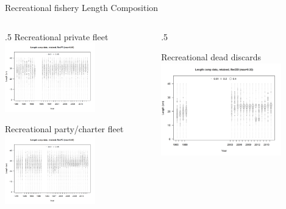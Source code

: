 \documentclass[ignorenonframetext,]{beamer}
\def\begincols{\begin{columns}}
\def\begincol{\begin{column}}
\def\endcol{\end{column}}
\def\endcols{\end{columns}}
\begin{document}
\begin{frame}{Recreational fishery Length Composition}

\begincols
 \begincol{.5\textwidth} Recreational private fleet
\includegraphics[height=3cm]{r4ss/plots_mod1/comp_lendat_bubflt4mkt2.png}

Recreational party/charter fleet
\includegraphics[height=3cm]{r4ss/plots_mod1/comp_lendat_bubflt5mkt2_page2.png}
\endcol
 \begincol{.5\textwidth} \centering

Recreational dead discards
\includegraphics[height=4cm]{r4ss/plots_mod1/comp_lendat_bubflt6mkt2.png}
\endcol
\endcols

\end{frame}
\end{document}
